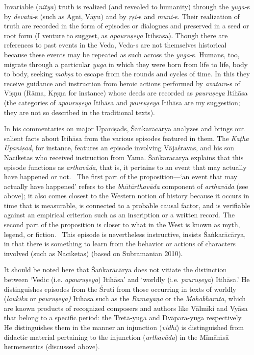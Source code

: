 Invariable (\textit{nitya}) truth is realized (and revealed to humanity) through the \textit{yuga-}s by \textit{devatā-}s (such as Agni, Vāyu) and by \textit{ṛṣi-}s and \textit{muni-}s. Their realization of truth are recorded in the form of episodes or dialogues and preserved in a seed or root form (I venture to suggest, as \textit{apauruṣeya} Itihsāsa). Though there are references to past events in the Veda, Veda-s are not themselves historical because these events may be repeated as such across the \textit{yuga-}s. Humans, too, migrate through a particular \textit{yuga} in which they were born from life to life, body to body, seeking \textit{mokṣa} to escape from the rounds and cycles of time. In this they receive guidance and instruction from heroic actions performed by \textit{avatāra}-s of Viṣṇu (Rāma, Kṛṣṇa for instance) whose deeds are recorded as \textit{pauruṣeya} Itihāsa (the categories of \textit{apauruṣeya} Itihāsa and \textit{pauruṣeya} Itihāsa are my suggestion; they are not so described in the traditional texts).

In his commentaries on major Upaniṣads, Śaṅkarācārya analyzes and brings out salient facts about Itihāsa from the various episodes featured in them. The \textit{Kaṭha Upaniṣad}, for instance, features an episode involving Vājaśravas, and his son Naciketas who received instruction from Yama. Śaṅkarācārya explains that this episode functions as \textit{arthavāda}, that is, it pertains to an event that may actually have happened or not.  The first part of the proposition—‘an event that may actually have happened’ refers to the \textit{bhūtārthavāda} component of \textit{arthavāda} (see above); it also comes closest to the Western notion of history because it occurs in time that is measurable, is connected to a probable causal factor, and is verifiable against an empirical criterion such as an inscription or a written record. The second part of the proposition is closer to what in the West is known as myth, legend, or fiction.  This episode is nevertheless instructive, insists Śaṅkarācārya, in that there is something to learn from the behavior or actions of characters involved (such as Naciketas) (based on Subramanian 2010). 

It should be noted here that Śaṅkarācārya does not vitiate the distinction between ‘Vedic (i.e. \textit{apauruṣeya}) Itihāsa’ and ‘worldly (i.e. \textit{pauruṣeya}) Itihāsa.’ He distinguishes episodes from the Śruti from those occurring in texts of worldly (\textit{laukika} or \textit{pauruṣeya)} Itihāsa such as the \textit{Rāmāyaṇa} or the \textit{Mahābhārata}, which are known products of recognized composers and authors like Vālmīki and Vyāsa that belong to a specific period: the Tretā-yuga and Dvāpara-yuga respectively. He distinguishes them in the manner an injunction (\textit{vidhi}) is distinguished from didactic material pertaining to the injunction (\textit{arthavāda}) in the Mīmāṁsā hermeneutics (discussed above). 


